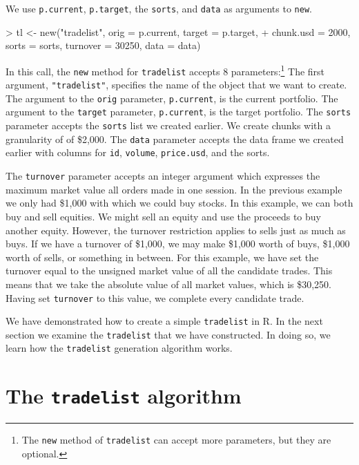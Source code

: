 \documentclass{article}
\begin{document}
We use \texttt{p.current}, \texttt{p.target}, the \texttt{sorts}, and
\texttt{data} as arguments to \texttt{new}.

\begin{Schunk}
\begin{Sinput}
> tl <- new("tradelist", orig = p.current, target = p.target, 
+     chunk.usd = 2000, sorts = sorts, turnover = 30250, data = data)
\end{Sinput}
\end{Schunk}


In this call, the \texttt{new} method for \texttt{tradelist} accepts 8
parameters:\footnote{The \texttt{new} method of \texttt{tradelist} can
accept more parameters, but they are optional.}  The first argument,
\texttt{"tradelist"}, specifies the name of the object that we want to
create.  The argument to the \texttt{orig} parameter,
\texttt{p.current}, is the current portfolio.  The argument to the
\texttt{target} parameter, \texttt{p.current}, is the target
portfolio.  The \texttt{sorts} parameter accepts the \texttt{sorts}
list we created earlier.  We create chunks with a granularity of of
\$2,000.  The \texttt{data}
parameter accepts the data frame we created earlier with columns for
\texttt{id}, \texttt{volume}, \texttt{price.usd}, and the sorts.

The \texttt{turnover} parameter accepts an integer argument which
expresses the maximum market value all orders made in one session.  In
the previous example we only had \$1,000 with which we could buy
stocks.  In this example, we can both buy and sell equities.  We might
sell an equity and use the proceeds to buy another equity.  However,
the turnover restriction applies to sells just as much as buys.  If we
have a turnover of \$1,000, we may make \$1,000 worth of buys, \$1,000
worth of sells, or something in between.  For this example, we have
set the turnover equal to the unsigned market value of all the
candidate trades.  This means that we take the absolute value of all
market values, which is \$30,250.  Having
set \texttt{turnover} to this value, we complete every candidate
trade.


We have demonstrated how to create a simple \texttt{tradelist} in R.
In the next section we examine the \texttt{tradelist} that we have
constructed.  In doing so, we learn how the \texttt{tradelist}
generation algorithm works.

\section{The \texttt{tradelist} algorithm}
\label{the tradelist algorithm}
                                                                                  
\end{document}

